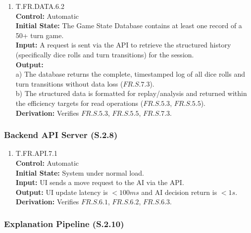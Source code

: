 \documentclass[12pt, titlepage]{article}
\begin{document}
\begin{enumerate}
\item{\hypertarget{T.FR.DATA.6.2}{T.FR.DATA.6.2}\\}
\textbf{Control:} Automatic \\
\textbf{Initial State:} The Game State Database contains at least one record of a 50+ turn game. \\
\textbf{Input:} A request is sent via the API to retrieve the structured history (specifically dice rolls and turn transitions) for the session. \\
\textbf{Output:}\\
    a) The database returns the complete, timestamped log of all dice rolls and turn transitions without data loss ($\hyperref[FR.S.7.3]{FR.S.7.3}$).  \\
    b) The structured data is formatted for replay/analysis and returned within the efficiency targets for read operations ($\hyperref[FR.S.5.3]{FR.S.5.3}$, $\hyperref[FR.S.5.5]{FR.S.5.5}$). \\
\textbf{Derivation:} Verifies $\hyperref[FR.S.5.3]{FR.S.5.3}$, $\hyperref[FR.S.5.5]{FR.S.5.5}$, $\hyperref[FR.S.7.3]{FR.S.7.3}$.
\end{enumerate}

\subsubsection{Backend API Server (S.2.8)}

\begin{enumerate}
    \item{\hypertarget{T.FR.API.7.1}{T.FR.API.7.1}\\}
    \textbf{Control:} Automatic \\
    \textbf{Initial State:} System under normal load. \\
    \textbf{Input:} UI sends a move request to the AI via the API. \\
    \textbf{Output:} UI update latency is $<100ms$ and AI decision return is $<1s$. \\
    \textbf{Derivation:} Verifies $\hyperref[FR.S.6.1]{FR.S.6.1}$, $\hyperref[FR.S.6.2]{FR.S.6.2}$, $\hyperref[FR.S.6.3]{FR.S.6.3}$.
\end{enumerate}

\subsubsection{Explanation Pipeline (S.2.10)}
\end{document}
